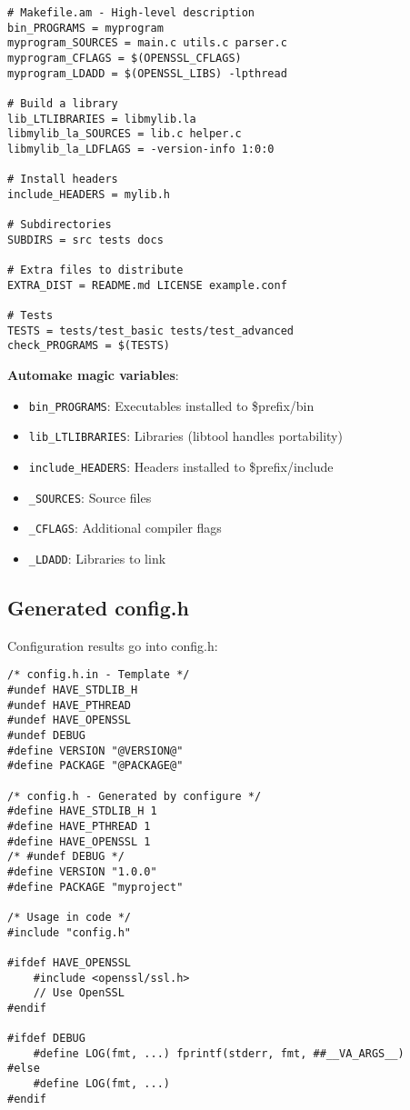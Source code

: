\begin{lstlisting}
# Makefile.am - High-level description
bin_PROGRAMS = myprogram
myprogram_SOURCES = main.c utils.c parser.c
myprogram_CFLAGS = $(OPENSSL_CFLAGS)
myprogram_LDADD = $(OPENSSL_LIBS) -lpthread

# Build a library
lib_LTLIBRARIES = libmylib.la
libmylib_la_SOURCES = lib.c helper.c
libmylib_la_LDFLAGS = -version-info 1:0:0

# Install headers
include_HEADERS = mylib.h

# Subdirectories
SUBDIRS = src tests docs

# Extra files to distribute
EXTRA_DIST = README.md LICENSE example.conf

# Tests
TESTS = tests/test_basic tests/test_advanced
check_PROGRAMS = $(TESTS)
\end{lstlisting}

\textbf{Automake magic variables}:
\begin{itemize}
    \item \texttt{bin\_PROGRAMS}: Executables installed to \$prefix/bin
    \item \texttt{lib\_LTLIBRARIES}: Libraries (libtool handles portability)
    \item \texttt{include\_HEADERS}: Headers installed to \$prefix/include
    \item \texttt{\_SOURCES}: Source files
    \item \texttt{\_CFLAGS}: Additional compiler flags
    \item \texttt{\_LDADD}: Libraries to link
\end{itemize}

\subsection{Generated config.h}

Configuration results go into config.h:

\begin{lstlisting}
/* config.h.in - Template */
#undef HAVE_STDLIB_H
#undef HAVE_PTHREAD
#undef HAVE_OPENSSL
#undef DEBUG
#define VERSION "@VERSION@"
#define PACKAGE "@PACKAGE@"

/* config.h - Generated by configure */
#define HAVE_STDLIB_H 1
#define HAVE_PTHREAD 1
#define HAVE_OPENSSL 1
/* #undef DEBUG */
#define VERSION "1.0.0"
#define PACKAGE "myproject"

/* Usage in code */
#include "config.h"

#ifdef HAVE_OPENSSL
    #include <openssl/ssl.h>
    // Use OpenSSL
#endif

#ifdef DEBUG
    #define LOG(fmt, ...) fprintf(stderr, fmt, ##__VA_ARGS__)
#else
    #define LOG(fmt, ...)
#endif
\end{lstlisting}


